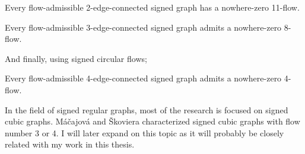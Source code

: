\begin{theorem}
    Every flow-admissible 2-edge-connected signed graph has a nowhere-zero 11-flow.
\end{theorem}

\begin{theorem}
    Every flow-admissible 3-edge-connected signed graph admits a nowhere-zero 8-flow.
\end{theorem}

And finally, using signed circular flows;

\begin{theorem}
    Every flow-admissible 4-edge-connected signed graph admits a nowhere-zero 4-flow.
\end{theorem}

In the field of signed regular graphs, most of the research is focused on signed cubic graphs. Máčajová and Škoviera\cite{cubic-signed-graphs}
characterized signed cubic graphs with flow number 3 or 4. I will later expand on this topic as it will probably be closely related with my work in this thesis.

